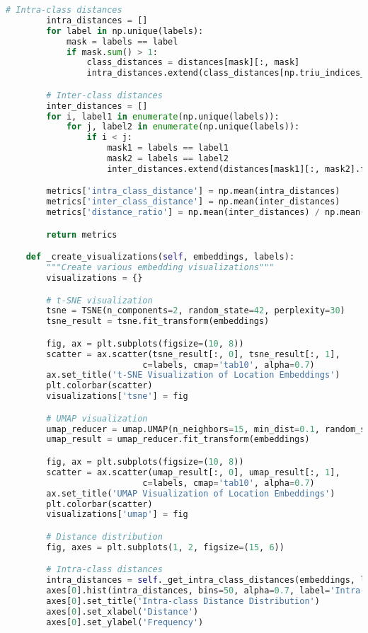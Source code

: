 \begin{lstlisting}[language=Python, caption=Comprehensive Evaluation Implementation]
        # Intra-class distances
        intra_distances = []
        for label in np.unique(labels):
            mask = labels == label
            if mask.sum() > 1:
                class_distances = distances[mask][:, mask]
                intra_distances.extend(class_distances[np.triu_indices_from(class_distances, k=1)])

        # Inter-class distances
        inter_distances = []
        for i, label1 in enumerate(np.unique(labels)):
            for j, label2 in enumerate(np.unique(labels)):
                if i < j:
                    mask1 = labels == label1
                    mask2 = labels == label2
                    inter_distances.extend(distances[mask1][:, mask2].flatten())

        metrics['intra_class_distance'] = np.mean(intra_distances)
        metrics['inter_class_distance'] = np.mean(inter_distances)
        metrics['distance_ratio'] = np.mean(inter_distances) / np.mean(intra_distances)

        return metrics

    def _create_visualizations(self, embeddings, labels):
        """Create various embedding visualizations"""
        visualizations = {}

        # t-SNE visualization
        tsne = TSNE(n_components=2, random_state=42, perplexity=30)
        tsne_result = tsne.fit_transform(embeddings)

        fig, ax = plt.subplots(figsize=(10, 8))
        scatter = ax.scatter(tsne_result[:, 0], tsne_result[:, 1],
                           c=labels, cmap='tab10', alpha=0.7)
        ax.set_title('t-SNE Visualization of Location Embeddings')
        plt.colorbar(scatter)
        visualizations['tsne'] = fig

        # UMAP visualization
        umap_reducer = umap.UMAP(n_neighbors=15, min_dist=0.1, random_state=42)
        umap_result = umap_reducer.fit_transform(embeddings)

        fig, ax = plt.subplots(figsize=(10, 8))
        scatter = ax.scatter(umap_result[:, 0], umap_result[:, 1],
                           c=labels, cmap='tab10', alpha=0.7)
        ax.set_title('UMAP Visualization of Location Embeddings')
        plt.colorbar(scatter)
        visualizations['umap'] = fig

        # Distance distribution
        fig, axes = plt.subplots(1, 2, figsize=(15, 6))

        # Intra-class distances
        intra_distances = self._get_intra_class_distances(embeddings, labels)
        axes[0].hist(intra_distances, bins=50, alpha=0.7, label='Intra-class')
        axes[0].set_title('Intra-class Distance Distribution')
        axes[0].set_xlabel('Distance')
        axes[0].set_ylabel('Frequency')


\end{lstlisting}
